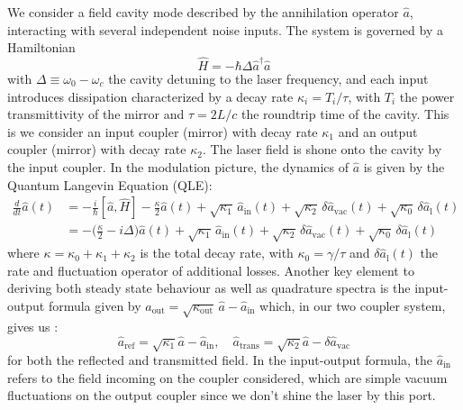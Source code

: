 We consider a field cavity mode described by the annihilation operator \(\hat{a}\), interacting with several independent noise inputs. The system is governed by a Hamiltonian 
\begin{equation}
\hat{H} = - \hbar \Delta  \hat{a}^\dagger \hat{a} 
\end{equation}
 with  $\Delta\equiv\omega_0 - \omega_c$ the cavity detuning to the laser frequency, and each input introduces dissipation characterized by a decay rate \(\kappa_i = T_i/\tau\), with $T_i$ the power transmittivity of the mirror and $\tau=2L/c$ the roundtrip time of the cavity. This is we consider an input coupler (mirror) with decay rate $\kappa_1$ and an output coupler (mirror) with decay rate $\kappa_2$. The laser field is shone onto the cavity by the input coupler. In the modulation picture, the dynamics of \(\hat{a}\) is given by the Quantum Langevin Equation (QLE):
%
\begin{equation}
\begin{split}
  \frac{d}{dt} \hat{a}(t) & = -\frac{i}{\hbar} [\hat{a}, \hat{H}] - \frac{\kappa}{2} \hat{a}(t) + \sqrt{\kappa_1} \, \hat{a}_{\mathrm{in}}(t)  + \sqrt{\kappa_2} \, \delta \hat{a}_{\mathrm{vac}}(t) + \sqrt{\kappa_0} \, \delta \hat{a}_{\mathrm{l}}(t) \\
  & = -\Big(\frac{\kappa}{2}-i\Delta\Big) \hat{a}(t) + \sqrt{\kappa_{\mathrm{1}}} \, \hat{a}_{\mathrm{in}}(t)  + \sqrt{\kappa_2} \, \delta \hat{a}_{\mathrm{vac}}(t)  + \sqrt{\kappa_0} \, \delta \hat{a}_{\mathrm{l}}(t) 
\label{eq:qle}
\end{split}
\end{equation}
where  \(\kappa = \kappa_0 + \kappa_1 + \kappa_2\) is the total decay rate, with $\kappa_0=\gamma/\tau$ and $ \delta \hat{a}_{\mathrm{l}}(t)$ the rate and fluctuation operator of additional losses. Another key element to deriving both steady state behaviour as well as quadrature spectra is the input-output formula given by $\hat{a}_{\mathrm{out}} = \sqrt{\kappa_{\mathrm{out}}} \, \hat{a} - \hat{a}_{\mathrm{in}} $ which, in our two coupler system, gives us :
\begin{equation}
  \hat{a}_{\mathrm{ref}} = \sqrt{\kappa_{1}}\hat{a} - \hat{a}_{\mathrm{in}} , \quad \hat{a}_{\mathrm{trans}} = \sqrt{\kappa_{2}}\hat{a} - \delta \hat{a}_{\mathrm{vac}} 
\end{equation}
for both the reflected and transmitted field. In the input-output formula, the $\hat{a}_{\mathrm{in}}$ refers to the field incoming on the coupler considered, which are simple vacuum fluctuations on the output coupler since we don't shine the laser by this port.\\
